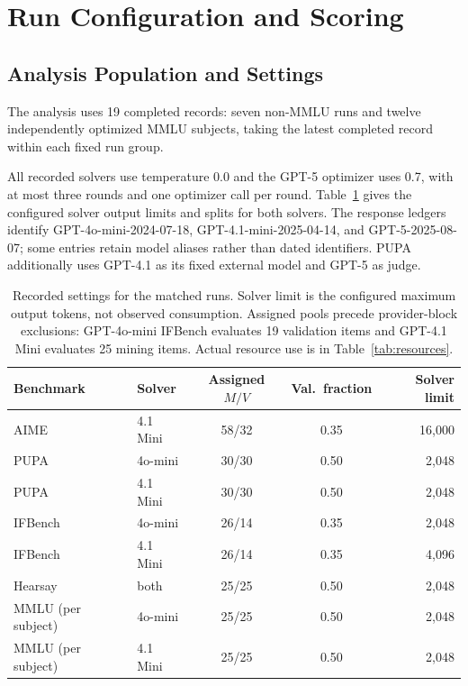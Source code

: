 \documentclass[11pt]{article}
\begin{document}
\section{Run Configuration and Scoring}
\label{app:config}
\subsection{Analysis Population and Settings}
\label{app:population}
The analysis uses 19 completed records: seven non-MMLU runs and twelve independently optimized MMLU
subjects, taking the latest completed record within each fixed run group.

All recorded solvers use temperature 0.0 and the GPT-5 optimizer uses 0.7, with at most three rounds and one optimizer
call per round. Table~\ref{tab:config} gives the configured solver output limits and splits for both solvers.
The response ledgers identify GPT-4o-mini-2024-07-18, GPT-4.1-mini-2025-04-14, and GPT-5-2025-08-07; some entries retain
model aliases rather than dated identifiers. PUPA additionally uses GPT-4.1 as its fixed external model and GPT-5 as judge.

\begin{table}[htbp]
\centering
\small
\setlength{\tabcolsep}{5pt}
\begin{tabular}{llccr}
\toprule
\rowcolor{midblue}Benchmark & Solver & Assigned $M/V$ & Val.\ fraction & Solver limit \\
\midrule
AIME & 4.1 Mini & 58/32 & 0.35 & 16,000 \\
PUPA & 4o-mini & 30/30 & 0.50 & 2,048 \\
PUPA & 4.1 Mini & 30/30 & 0.50 & 2,048 \\
IFBench & 4o-mini & 26/14 & 0.35 & 2,048 \\
IFBench & 4.1 Mini & 26/14 & 0.35 & 4,096 \\
Hearsay & both & 25/25 & 0.50 & 2,048 \\
MMLU (per subject) & 4o-mini & 25/25 & 0.50 & 2,048 \\
MMLU (per subject) & 4.1 Mini & 25/25 & 0.50 & 2,048 \\
\bottomrule
\end{tabular}
\caption{Recorded settings for the matched runs. Solver limit is the configured maximum output tokens, not observed
consumption. Assigned pools precede provider-block exclusions: GPT-4o-mini IFBench evaluates 19 validation items and
GPT-4.1 Mini evaluates 25 mining items. Actual resource use is in Table~\ref{tab:resources}.}
\label{tab:config}
\end{table}
\end{document}
